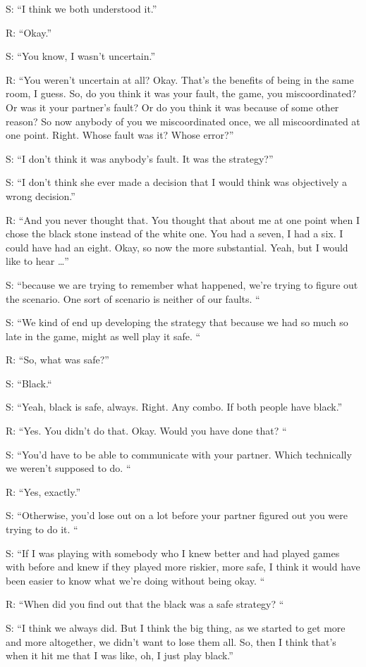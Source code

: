 S: “I think we both understood it.” 

R: “Okay.” 

S: “You know, I wasn't uncertain.”

R: “You weren’t uncertain at all? Okay. That's the benefits of being in the same room, I guess. So, do you think it was your fault, the game, you miscoordinated? Or was it your partner's fault? Or do you think it was because of some other reason? So now anybody of you we miscoordinated once, we all miscoordinated at one point. Right. Whose fault was it? Whose error?”

S: “I don’t think it was anybody’s fault. It was the strategy?” 

S: “I don't think she ever made a decision that I would think was objectively a wrong decision.” 

R: “And you never thought that. You thought that about me at one point when I chose the black stone instead of the white one. You had a seven, I had a six. I could have had an eight. Okay, so now the more substantial. Yeah, but I would like to hear …”

S: “because we are trying to remember what happened, we're trying to figure out the scenario. One sort of scenario is neither of our faults. “

S: “We kind of end up developing the strategy that because we had so much so late in the game, might as well play it safe. “

R: “So, what was safe?”

S: “Black.“

S: “Yeah, black is safe, always. Right. Any combo. If both people have black.” 

R: “Yes. You didn't do that. Okay. Would you have done that? “

S: “You'd have to be able to communicate with your partner. Which technically we weren't supposed to do. “

R: “Yes, exactly.”

S: “Otherwise, you'd lose out on a lot before your partner figured out you were trying to do it. “

S: “If I was playing with somebody who I knew better and had played games with before and knew if they played more riskier, more safe, I think it would have been easier to know what we're doing without being okay. “

R: “When did you find out that the black was a safe strategy? “

S: “I think we always did. But I think the big thing, as we started to get more and more altogether, we didn't want to lose them all. So, then I think that's when it hit me that I was like, oh, I just play black.”


